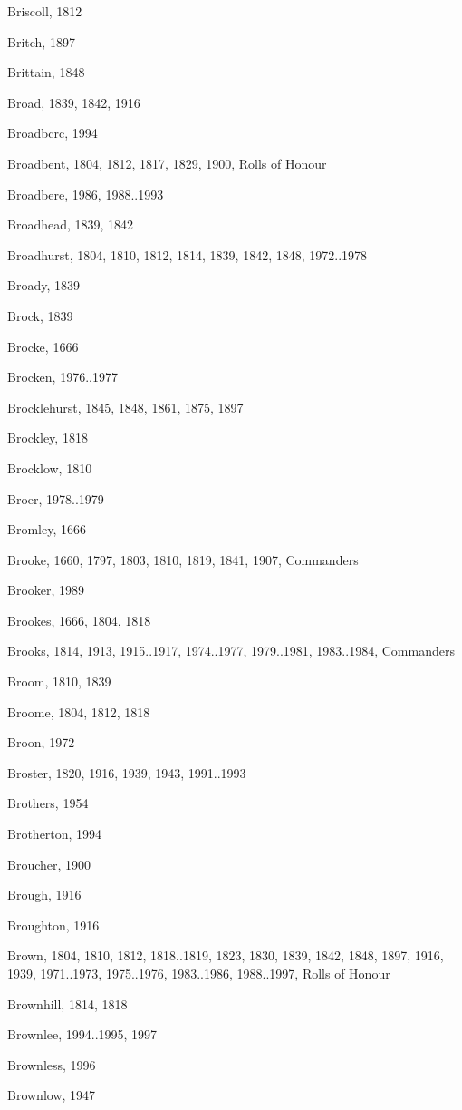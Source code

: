 \begin{theindex}
\item Briscoll, 1812
\item Britch, 1897
\item Brittain, 1848
\item Broad, 1839, 1842, 1916
\item Broadbcrc, 1994
\item Broadbent, 1804, 1812, 1817, 1829, 1900, Rolls of Honour
\item Broadbere, 1986, 1988..1993
\item Broadhead, 1839, 1842
\item Broadhurst, 1804, 1810, 1812, 1814, 1839, 1842, 1848, 1972..1978
\item Broady, 1839
\item Brock, 1839
\item Brocke, 1666
\item Brocken, 1976..1977
\item Brocklehurst, 1845, 1848, 1861, 1875, 1897
\item Brockley, 1818
\item Brocklow, 1810
\item Broer, 1978..1979
\item Bromley, 1666
\item Brooke, 1660, 1797, 1803, 1810, 1819, 1841, 1907, Commanders
\item Brooker, 1989
\item Brookes, 1666, 1804, 1818
\item Brooks, 1814, 1913, 1915..1917, 1974..1977, 1979..1981, 1983..1984, Commanders
\item Broom, 1810, 1839
\item Broome, 1804, 1812, 1818
\item Broon, 1972
\item Broster, 1820, 1916, 1939, 1943, 1991..1993
\item Brothers, 1954
\item Brotherton, 1994
\item Broucher, 1900
\item Brough, 1916
\item Broughton, 1916
\item Brown, 1804, 1810, 1812, 1818..1819, 1823, 1830, 1839, 1842, 1848, 1897, 1916, 1939, 1971..1973, 1975..1976, 1983..1986, 1988..1997, Rolls of Honour
\item Brownhill, 1814, 1818
\item Brownlee, 1994..1995, 1997
\item Brownless, 1996
\item Brownlow, 1947

\end{theindex}
